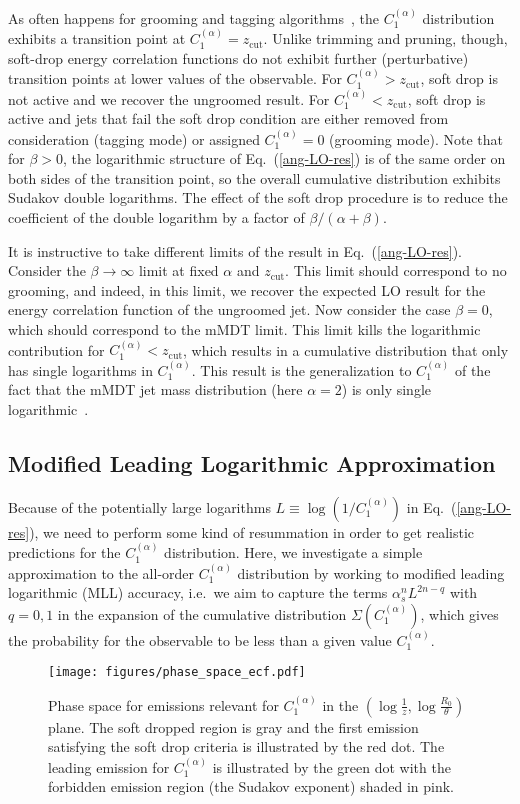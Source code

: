 \documentclass[letterpaper,11pt]{article}
\newcommand{\as}{\alpha_s}
\newcommand{\C}[2]{C^{(#2)}_{#1}}
\newcommand{\zcut}{z_\text{cut}}
\newcommand{\ea}{{\C{1}{\alpha}}}
\DeclareRobustCommand{\Eq}[1]{Eq.~(\ref{#1})}
\begin{document}
As often happens for grooming and tagging algorithms~\cite{taggersRES, taggersNLO}, the $\ea$ distribution exhibits a transition point at $\ea=\zcut$.  Unlike trimming and pruning, though, soft-drop energy correlation functions do not exhibit further (perturbative) transition points at lower values of the observable.   For $\ea> \zcut$, soft drop is not active and we recover the ungroomed result.  For $\ea < \zcut$, soft drop is active and jets that fail the soft drop condition are either removed from consideration (tagging mode) or assigned $\ea = 0$ (grooming mode).  Note that for $\beta > 0$, the logarithmic structure of \Eq{ang-LO-res} is of the same order on both sides of the transition point, so the overall cumulative distribution exhibits Sudakov double logarithms.  The effect of the soft drop procedure is to reduce the coefficient of the double logarithm by a factor of $\beta/(\alpha + \beta)$.

It is instructive to take different limits of the result in \Eq{ang-LO-res}.  Consider the $\beta\to \infty$ limit at fixed $\alpha$ and $\zcut$.  This limit should correspond to no grooming, and indeed, in this limit, we recover the expected LO result for the energy correlation function of the ungroomed jet.  Now consider the case $\beta = 0$, which should correspond to the mMDT limit.  This limit kills the logarithmic contribution for $\ea < \zcut$, which results in a cumulative distribution that only has single logarithms in $\ea$. This result is the generalization to $\ea$ of the fact that the mMDT jet mass distribution (here $\alpha=2$) is only single logarithmic~\cite{taggersRES, taggersNLO}.

\subsection{Modified Leading Logarithmic Approximation}
\label{sec:MLL}

Because of the potentially large logarithms $L \equiv \log (1/\ea)$ in \Eq{ang-LO-res}, we need to perform some kind of resummation in order to get realistic predictions for the $\ea$ distribution.  Here, we investigate a simple approximation to the all-order $\ea$ distribution by working to modified leading logarithmic (MLL) accuracy, i.e.\ we aim to capture the terms $\as^n L^{2n-q}$ with $q=0,1$ in the expansion of the cumulative distribution $\Sigma(\ea)$, which gives the probability for the observable to be less than a given value $\ea$.


\begin{figure}
\begin{center}
\texttt{[image: figures/phase\_space\_ecf.pdf]}
\end{center}
\caption{Phase space for emissions relevant for $\ea$ in the $(\log \frac{1}{z},\log \frac{R_0}{\theta})$ plane.  The soft dropped region is gray and the first emission satisfying the soft drop criteria is illustrated by the red dot.  The leading emission for $\ea$ is illustrated by the  green dot with the forbidden emission region (the Sudakov exponent) shaded in pink.
}
\label{fig:groomedregions-C1}
\end{figure}
\end{document}
